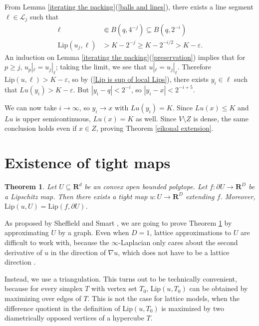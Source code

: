 \documentclass[reqno,11pt]{amsart}
\newcommand{\RR}{\mathbf{R}}
\newcommand{\Lip}{\mathrm{Lip}}
\newtheorem{theorem}{Theorem}[section]
\theoremstyle{definition}
\numberwithin{equation}{section}
\begin{document}
From Lemma \ref{iterating the packing}(\ref{balls and lines}), there exists a line segment $\ell \in \mathscr L_j$ such that
\begin{align*}
\ell &\Subset B(q, 4^{-j}) \subseteq B(q, 2^{-i}) \\
\Lip(u_j, \ell) &> K - 2^{-j} \geq K - 2^{-i/2} > K - \varepsilon.
\end{align*}
An induction on Lemma \ref{iterating the packing}(\ref{preservation}) implies that for $p \geq j$, $u_p|_\ell = u_j|_\ell$; taking the limit, we see that $u|_\ell = u_j|_\ell$.
Therefore $\Lip(u, \ell) > K - \varepsilon$, so by (\ref{Lip is sup of local Lips}), there exists $y_i \in \ell$ such that $Lu(y_i) > K - \varepsilon$.
But $|y_i - q| < 2^{-i}$, so $|y_i - x| < 2^{-i + 5}$.

We can now take $i \to \infty$, so $y_i \to x$ with $Lu(y_i) = K$.
Since $Lu(x) \leq K$ and $Lu$ is upper semicontinuous, $Lu(x) = K$ as well.
Since $V \setminus Z$ is dense, the same conclusion holds even if $x \in Z$, proving Theorem \ref{eikonal extension}.



\section{Existence of tight maps}
\begin{theorem}\label{existence of tight maps}
Let $U \subseteq \RR^d$ be an convex open bounded polytope.
Let $f: \partial U \to \RR^D$ be a Lipschitz map.
Then there exists a tight map $u: U \to \RR^D$ extending $f$.
Moreover, $\Lip(u, U) = \Lip(f, \partial U)$.
\end{theorem}

As proposed by Sheffield and Smart \cite[Question 5.1]{Sheffield12}, we are going to prove Theorem \ref{existence of tight maps} by approximating $U$ by a graph.
Even when $D = 1$, lattice approximations to $U$ are difficult to work with, because the $\infty$-Laplacian only cares about the second derivative of $u$ in the direction of $\nabla u$, which does not have to be a lattice direction \cite[\S3]{Oberman13}.

Instead, we use a triangulation.
This turns out to be technically convenient, because for every simplex $T$ with vertex set $T_0$, $\Lip(u, T_0)$ can be obtained by maximizing over edges of $T$.
This is not the case for lattice models, when the difference quotient in the definition of $\Lip(u, T_0)$ is maximized by two diametrically opposed vertices of a hypercube $T$.
\end{document}
